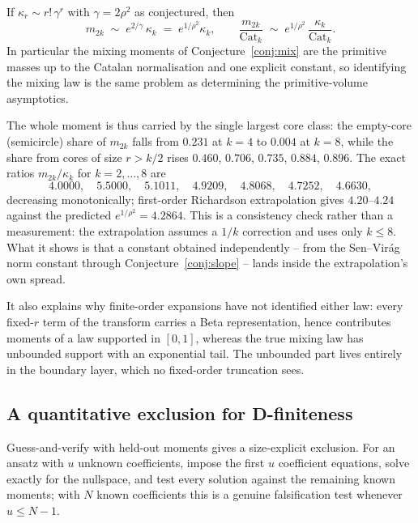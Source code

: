 \begin{proposition}\label{prop:boundary}
If $\kappa_r\sim r!\,\gamma^r$ with $\gamma=2\rho^2$ as conjectured, then
\[
m_{2k}\;\sim\;e^{2/\gamma}\,\kappa_k\;=\;e^{1/\rho^2}\kappa_k ,
\qquad
\frac{m_{2k}}{\mathrm{Cat}_k}\;\sim\;e^{1/\rho^2}\,
\frac{\kappa_k}{\mathrm{Cat}_k}.
\]
In particular the mixing moments of Conjecture~\ref{conj:mix} are the
primitive masses up to the Catalan normalisation and one explicit
constant, so identifying the mixing law is the same problem as
determining the primitive-volume asymptotics.
\end{proposition}

The whole moment is thus carried by the single largest core class: the
empty-core (semicircle) share of $m_{2k}$ falls from $0.231$ at $k=4$ to
$0.004$ at $k=8$, while the share from cores of size $r>k/2$ rises
$0.460$, $0.706$, $0.735$, $0.884$, $0.896$.  The exact ratios
$m_{2k}/\kappa_k$ for $k=2,\dots,8$ are
\[
4.0000,\quad 5.5000,\quad 5.1011,\quad 4.9209,\quad 4.8068,\quad
4.7252,\quad 4.6630,
\]
decreasing monotonically; first-order Richardson extrapolation gives
$4.20$--$4.24$ against the predicted $e^{1/\rho^2}=4.2864$.  This is a
consistency check rather than a measurement: the extrapolation assumes a
$1/k$ correction and uses only $k\le8$.  What it shows is that a
constant obtained independently -- from the Sen--Vir\'ag norm constant
through Conjecture~\ref{conj:slope} -- lands inside the extrapolation's
own spread.

It also explains why finite-order expansions have not identified either
law: every fixed-$r$ term of the transform carries a Beta
representation, hence contributes moments of a law supported in $[0,1]$,
whereas the true mixing law has unbounded support with an exponential
tail.  The unbounded part lives entirely in the boundary layer, which no
fixed-order truncation sees.

\subsection*{A quantitative exclusion for D-finiteness}

Guess-and-verify with held-out moments gives a size-explicit exclusion.
For an ansatz with $u$ unknown coefficients, impose the first $u$
coefficient equations, solve exactly for the nullspace, and test every
solution against the remaining known moments; with $N$ known
coefficients this is a genuine falsification test whenever $u\le N-1$.

